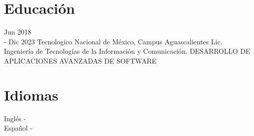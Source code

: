 \documentclass[10pt, a4paper]{article}
\begin{document}
	
	\section*{Educación} 
		\eduEntry
		{
			Jun 2018 \\- Dic 2023
		}{
			Tecnologico Nacional de México, Campus Aguascalientes
		}{
			Lic. Ingeniería de Tecnologías de la Información y Comunicación. 
		}{		 
			DESARROLLO DE APLICACIONES AVANZADAS DE SOFTWARE
		}
		
		
	\section*{Idiomas}
			Inglés - \\
			Español  - 
\end{document}
